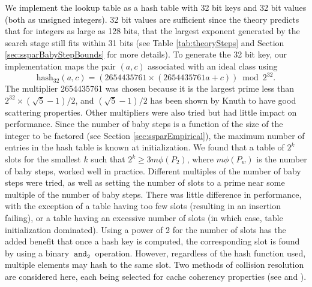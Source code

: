 \documentclass{ucalgthes1}
\theoremstyle{definition}
\newcommand{\band}{~\texttt{and}_\texttt{2}~}
\newcommand{\hash}{\textrm{hash}_{\textrm{32}}}
\begin{document}
We implement the lookup table as a hash table with 32 bit keys and 32 bit values (both as unsigned integers).  32 bit values are sufficient since the theory predicts that for integers as large as 128 bits, that the largest exponent generated by the search stage still fits within 31 bits (see Table \ref{tab:theorySteps} and Section \ref{sec:ssparBabyStepBounds} for more details).  To generate the 32 bit key, our implementation maps the pair $(a, c)$ associated with an ideal class using
\[
	\hash(a, c) = (2654435761 \times (2654435761a + c)) \bmod 2^{32}.
\]
The multiplier 2654435761 was chosen because it is the largest prime less than $2^{32} \times (\sqrt 5 - 1)/2$, and $(\sqrt 5 - 1)/2$ has been shown by Knuth \cite[Section~6.4]{Knuth1998} to have good scattering properties.  Other multipliers were also tried but had little impact on performance.  Since the number of baby steps is a function of the size of the integer to be factored (see Section \ref{sec:ssparEmpirical}), the maximum number of entries in the hash table is known at initialization.  We found that a table of $2^k$ slots for the smallest $k$ such that $2^k \ge 3m\phi(P_2)$, where $m\phi(P_w)$ is the number of baby steps, worked well in practice.  Different multiples of the number of baby steps were tried, as well as setting the number of slots to a prime near some multiple of the number of baby steps.  There was little difference in performance, with the exception of a table having too few slots (resulting in an insertion failing), or a table having an excessive number of slots (in which case, table initialization dominated).  Using a power of 2 for the number of slots has the added benefit that once a hash key is computed, the corresponding slot is found by using a binary $\band$ operation.  However, regardless of the hash function used, multiple elements may hash to the same slot.  Two methods of collision resolution are considered here, each being selected for cache coherency properties (see \cite[Subsection~11.2]{Cormen2001} and \cite{Kuchling2008}).
\end{document}
